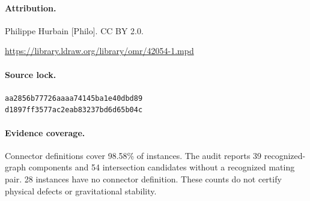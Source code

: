 \paragraph{Attribution.}Philippe Hurbain [Philo]. CC BY 2.0.\par\noindent\url{https://library.ldraw.org/library/omr/42054-1.mpd}
\paragraph{Source lock.}\small\texttt{aa2856b77726aaaa74145ba1e40dbd89}\\\texttt{d1897ff3577ac2eab83237bd6d65b04c}\normalsize
\paragraph{Evidence coverage.}Connector definitions cover 98.58\% of instances. The audit reports 39 recognized-graph components and 54 intersection candidates without a recognized mating pair. 28 instances have no connector definition. These counts do not certify physical defects or gravitational stability.
